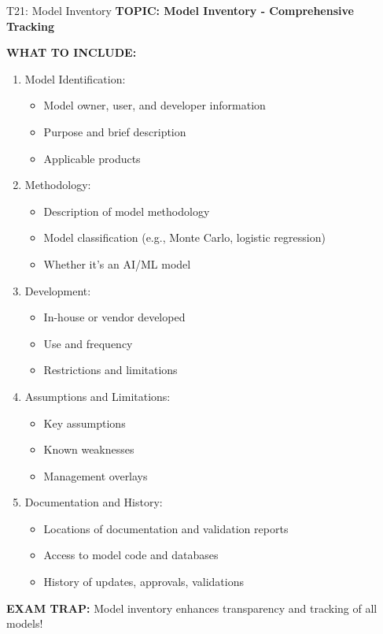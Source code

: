 \documentclass[8pt]{beamer}
\begin{document}
	\begin{frame}{T21: Model Inventory}
		\fontsize{6.5}{7.5}\selectfont
		\textbf{TOPIC: Model Inventory - Comprehensive Tracking}
		
		\vspace{0.1cm}
		\textbf{WHAT TO INCLUDE:}
		\begin{enumerate}
			\item \textcolor{myblue}{Model Identification:}
			\begin{itemize}
				\item Model owner, user, and developer information
				\item Purpose and brief description
				\item Applicable products
			\end{itemize}
			\item \textcolor{myblue}{Methodology:}
			\begin{itemize}
				\item Description of model methodology
				\item Model classification (e.g., Monte Carlo, logistic regression)
				\item Whether it's an AI/ML model
			\end{itemize}
			\item \textcolor{myblue}{Development:}
			\begin{itemize}
				\item In-house or vendor developed
				\item Use and frequency
				\item Restrictions and limitations
			\end{itemize}
			\item \textcolor{myblue}{Assumptions and Limitations:}
			\begin{itemize}
				\item Key assumptions
				\item Known weaknesses
				\item Management overlays
			\end{itemize}
			\item \textcolor{myblue}{Documentation and History:}
			\begin{itemize}
				\item Locations of documentation and validation reports
				\item Access to model code and databases
				\item History of updates, approvals, validations
			\end{itemize}
		\end{enumerate}
		
		\textcolor{myred}{\textbf{EXAM TRAP:}} Model inventory enhances \textcolor{myblue}{transparency and tracking} of all models!
	\end{frame}
	
\end{document}
